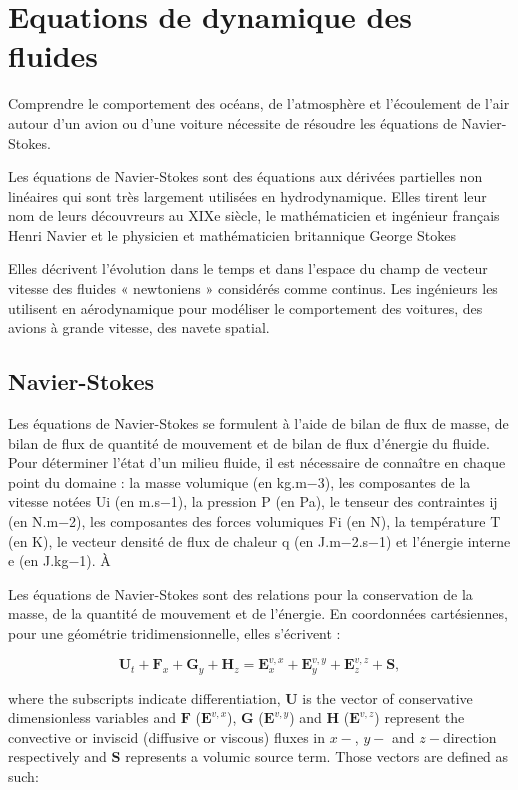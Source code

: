 \section{Equations de dynamique des fluides}

Comprendre le comportement des océans, de l'atmosphère et l'écoulement de l'air autour d'un avion ou d'une voiture nécessite de résoudre les équations de Navier-Stokes.

Les équations de Navier-Stokes sont des équations aux dérivées partielles non linéaires qui sont très largement utilisées en hydrodynamique. Elles tirent leur nom de leurs découvreurs au XIXe siècle, le mathématicien et ingénieur français Henri Navier et le physicien et mathématicien britannique George Stokes

Elles décrivent l'évolution dans le temps et dans l'espace du champ de vecteur vitesse des fluides « newtoniens » considérés comme continus. Les ingénieurs les utilisent en aérodynamique pour modéliser le comportement des voitures, des avions à grande vitesse, des navete spatial.


\subsection {Navier-Stokes}
Les équations de Navier-Stokes se formulent à l’aide de bilan de flux de masse, de bilan de flux de quantité de mouvement et de bilan de flux d’énergie du fluide. Pour déterminer l’état d’un milieu fluide, il est nécessaire de connaître en chaque point du domaine : la masse volumique (en kg.m−3), les composantes de la vitesse notées Ui (en m.s−1), la pression P (en Pa), le tenseur des contraintes ij (en N.m−2), les composantes des forces volumiques Fi (en N), la température T (en K), le vecteur densité de flux de chaleur q (en J.m−2.s−1) et l’énergie interne e (en J.kg−1).
À

Les équations de Navier-Stokes sont des relations pour la conservation de la masse, de la quantité de mouvement et de l'énergie. En coordonnées cartésiennes, pour une géométrie tridimensionnelle, elles s'écrivent :



\begin{equation}
    \mathbf{U}_t + \mathbf{F}_x + \mathbf{G}_y + \mathbf{H}_z = \mathbf{E}_x^{v,x} + \mathbf{E}_y^{v,y} + \mathbf{E}_z^{v,z} + \mathbf{S},
    \label{eq:cons_ns}
\end{equation}

where the subscripts indicate differentiation, $\mathbf{U}$ is the vector of conservative dimensionless variables and $\mathbf{F}$ ($\mathbf{E}^{v,x}$), $\mathbf{G}$ ($\mathbf{E}^{v,y}$) and $\mathbf{H}$ ($\mathbf{E}^{v,z}$) represent the convective or inviscid (diffusive or viscous) fluxes in $x-$, $y-$ and $z-$direction respectively and $\mathbf{S}$ represents a volumic source term.
Those vectors are defined as such:

